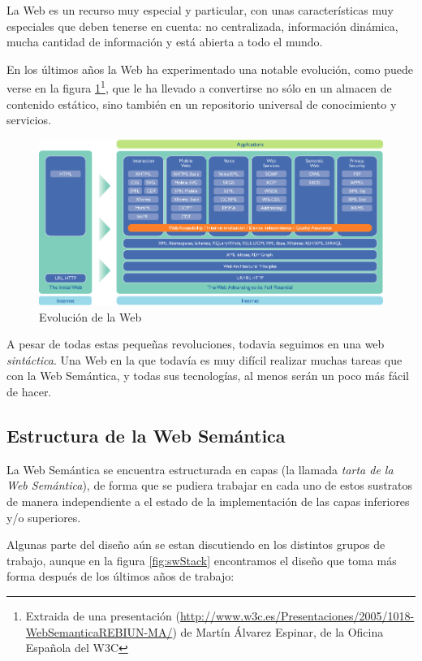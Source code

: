 La Web es un recurso muy especial y particular, con unas características muy 
especiales que deben tenerse en cuenta: no centralizada, información dinámica,
mucha cantidad de información y está abierta a todo el mundo.

En los últimos años la Web ha experimentado una notable evolución, como puede 
verse en la figura \ref{fig:evoWeb}\footnote{Extraida de una presentación 
(\url{http://www.w3c.es/Presentaciones/2005/1018-WebSemanticaREBIUN-MA/}) de 
Martín Álvarez Espinar, de la Oficina Española del W3C}, que le ha llevado a 
convertirse no sólo en un almacen de contenido estático, sino también en un 
repositorio universal de conocimiento y servicios.

\begin{figure}[ht]
	\centering
	\includegraphics[width=12cm]{images/web-evolution.png}
	\caption{Evolución de la Web}
	\label{fig:evoWeb}
\end{figure}

A pesar de todas estas pequeñas revoluciones, todavia seguimos en una web 
\emph{sintáctica}. Una Web en la que todavía es muy difícil realizar
muchas tareas que con la Web Semántica, y todas sus tecnologías, al menos
serán un poco más fácil de hacer.

\subsection{Estructura de la Web Semántica}

La Web Semántica se encuentra estructurada en capas (la llamada \emph{tarta de 
la Web Semántica}), de forma que se pudiera trabajar en cada uno de estos
sustratos de manera independiente a el estado de la implementación de las
capas inferiores y/o superiores.

Algunas parte del diseño aún se estan discutiendo en los distintos grupos de
trabajo, aunque en la figura \ref{fig:swStack} encontramos el diseño que toma
más forma después de los últimos años de trabajo:

